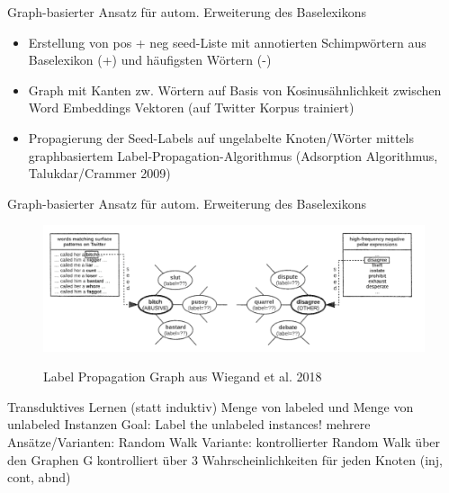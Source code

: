 \documentclass{beamer}
\begin{document}
\begin{frame}{Graph-basierter Ansatz für autom. Erweiterung des Baselexikons}
\begin{itemize}
\item Erstellung von pos + neg seed-Liste mit annotierten Schimpwörtern aus Baselexikon (+) und häufigsten Wörtern (-)
\item Graph mit Kanten zw. Wörtern auf Basis von Kosinusähnlichkeit zwischen Word Embeddings Vektoren (auf Twitter Korpus trainiert)
\item Propagierung der Seed-Labels auf ungelabelte Knoten/Wörter mittels graphbasiertem Label-Propagation-Algorithmus (Adsorption Algorithmus, Talukdar/Crammer 2009)
\end{itemize}
\end{frame}

\begin{frame}[plain, t]
{Graph-basierter Ansatz für autom. Erweiterung des Baselexikons}
\bigskip
\bigskip
\center
\begin{figure}[hbt]
    \begin{center}
        \includegraphics[width=\textwidth,height=0.95\textheight,keepaspectratio]{graph.png}\\
    \end{center}
\caption{Label Propagation Graph aus Wiegand et al. 2018}\label{preprocess}
\end{figure}

\end{frame}

Transduktives Lernen (statt induktiv)
Menge von labeled und Menge von unlabeled Instanzen
Goal: Label the unlabeled instances! 
mehrere Ansätze/Varianten: 
Random Walk Variante: kontrollierter Random Walk über den Graphen G
kontrolliert über 3 Wahrscheinlichkeiten für jeden Knoten (inj, cont, abnd) 
   

\end{document}
